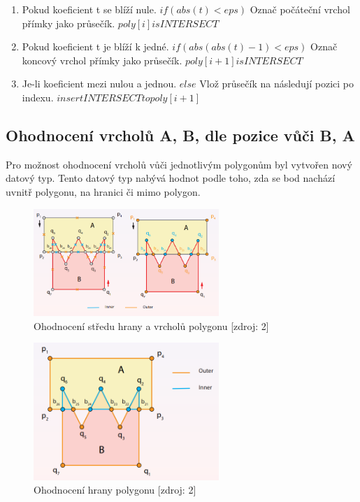 \documentclass[a4paper, 12pt]{article}
\begin{document}
\begin{enumerate}
\item Pokud koeficient t se blíží nule. $ if( abs(t) < eps )$
\subitem Označ počáteční vrchol přímky jako průsečík. $ poly[i] is INTERSECT $
\item Pokud koeficient t je blíží k jedné. $if( abs(abs(t)-1) < eps ) $
\subitem Označ koncový vrchol přímky jako průsečík. $ poly[i+1] is INTERSECT $
\item Je-li koeficient mezi nulou a jednou. $ else $
\subitem Vlož průsečík na následují pozici po indexu. $ insert INTERSECT to poly[i+1] $
\end{enumerate}

\subsection{Ohodnocení vrcholů A, B, dle pozice vůči B, A}
Pro možnost ohodnocení vrcholů vůči jednotlivým polygonům byl vytvořen nový datový typ. Tento datový typ nabývá hodnot podle toho, zda se bod nachází uvnitř polygonu, na hranici či mimo polygon. 

\begin{figure}[h!]
	\centering
	\includegraphics[width=7cm]{pictures/ohodnocenivrcholu.png}
	\caption{Ohodnocení středu hrany a vrcholů polygonu [zdroj: 2]}
\end{figure}

\begin{figure}[h!]
	\centering
	\includegraphics[width=7cm]{pictures/ohodnocenihran.png}
	\caption{Ohodnocení hrany polygonu [zdroj: 2]}
\end{figure}
\end{document}
